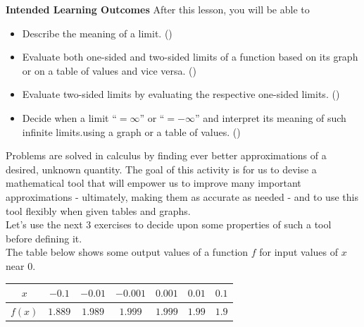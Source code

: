 \documentclass[10pt]{article}
\begin{document}
\newpage
\textbf{Intended Learning Outcomes}
After this lesson, you will be able to 

\begin{itemize}
    \item Describe the meaning of a limit. ()
    \item Evaluate both one-sided and two-sided limits of a function based on its graph or on a table of values and vice versa. ()
    \item Evaluate two-sided limits by evaluating the respective one-sided limits. ()
    \item Decide when a limit “$=\infty$” or “$=-\infty$” and interpret its meaning of such infinite limits.using a graph or a table of values. ()
\end{itemize}

\vspace{-0.5cm}

\hrulefill

\vspace{0.3cm}

Problems are solved in calculus by finding ever better approximations of a desired, unknown quantity. The goal of this activity is for us to devise a mathematical tool that will empower us to improve many important approximations - ultimately, making them as accurate as needed - and to use this tool flexibly when given tables and graphs.\\

Let's use the next $3$ exercises to decide upon some properties of such a tool before defining it.\\


 The table below shows some output values of a function $f$ for input values of $x$ near $0$. 
\begin{center}
\begin{tabular}{| c || c c c c c c |}
\hline
 $x$  & $-0.1$ & $-0.01$ & $-0.001$ &  $0.001$ & $0.01$ & $0.1$\\ 
 \hline
 $f(x)$ & $1.889$ & $1.989$  & $1.999$ & $1.999$   & $1.99$  & $1.9$\\
 \hline
\end{tabular}
\end{center}
\end{document}
